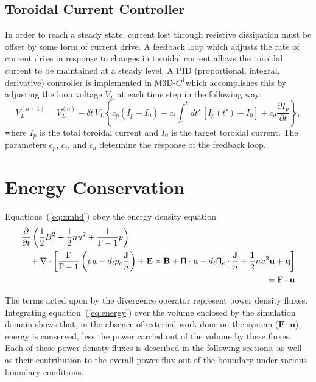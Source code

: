 \documentclass[draft]{book}
\newcommand{\dt}{\ensuremath{\delta t}}
\newcommand{\ddt}[1]{\frac{\partial #1}{\partial t}}
\renewcommand{\vec}[1]{\ensuremath{\mathbf{#1}}}
\newcommand{\tensor}[1]{\mathsf{#1}}
\newcommand{\B}{\vec{B}}
\newcommand{\E}{\vec{E}}
\renewcommand{\u}{\vec{u}}
\newcommand{\F}{\vec{F}}
\renewcommand{\j}{\vec{J}}
\newcommand{\q}{\vec{q}}
\newcommand{\jn}{\frac{\j}{n}}
\renewcommand{\P}{\tensor{\Pi}}
\newcommand{\codename}{M3D-$C^1$}
\renewcommand{\div}[1]{\nabla \cdot #1}
\begin{document}
\subsection{Toroidal Current Controller \label{sec:current_controller}}

In order to reach a steady state, current lost through resistive
dissipation must be offset by some form of current drive.  A feedback
loop which adjusts the rate of current drive in response to changes in
toroidal current allows the toroidal current to be maintained at a
steady level.  A PID (proportional, integral, derivative) controller
is implemented in \codename which accomplishes this by adjusting the
loop voltage $V_L$ at each time step in the following way:
\begin{equation}
  V_L^{(n+1)} = V_L^{(n)} - \dt\, V_L \left\{ c_p (I_p - I_0) + c_i
  \int_0^t dt'\,[I_p(t') - I_0] + c_d \ddt{I_p} \right\},
\end{equation}
where $I_p$ is the total toroidal current and $I_0$ is the target
toroidal current.  The parameters $c_p$, $c_i$, and $c_d$ determine
the response of the feedback loop.


\section{Energy Conservation}

Equations~(\ref{eq:xmhd}) obey the energy density equation
\begin{eqnarray}
 \lefteqn{\ddt{}\left(\frac{1}{2}B^2 + \frac{1}{2}n u^2 + \frac{1}{\Gamma-1}p
  \right)} \nonumber \\ & & \mbox{}+ \div{\left[
      \frac{\Gamma}{\Gamma-1} \left(p \u - d_i p_e \jn\right)
      + \E \times \B + \P \cdot \u - d_i \P_e \cdot \jn
      + \frac{1}{2} n u^2 \u + \q \right]} \nonumber
 \\ & & = \F \cdot \u \label{eq:energy}
\end{eqnarray}

The terms acted upon by the divergence operator represent power
density fluxes.  Integrating equation~(\ref{eq:energy}) over the
volume enclosed by the simulation domain shows that, in the absence of
external work done on the system ($\F \cdot \u$), energy is conserved,
less the power carried out of the volume by these fluxes.  Each of
these power density fluxes is described in the following sections, as
well as their contribution to the overall power flux out of the
boundary under various boundary conditions.
\end{document}
